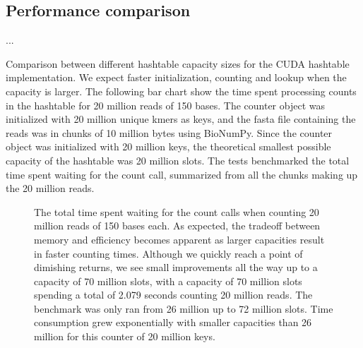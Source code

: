 
\subsection{Performance comparison}
...

Comparison between different hashtable capacity sizes for the CUDA hashtable implementation. We expect faster initialization, counting and lookup when the capacity is larger. 
The following bar chart show the time spent processing counts in the hashtable for 20 million reads of 150 bases.
The counter object was initialized with 20 million unique kmers as keys, and the fasta file containing the reads was in chunks of 10 million bytes using BioNumPy.
Since the counter object was initialized with 20 million keys, the theoretical smallest possible capacity of the hashtable was 20 million slots.
The tests benchmarked the total time spent waiting for the count call, summarized from all the chunks making up the 20 million reads.

\begin{figure}[ht!]\label{figure:cuht-capacity}
\begin{center}
\caption{The total time spent waiting for the count calls when counting 20 million reads of 150 bases each. As expected, the tradeoff between memory and efficiency becomes apparent as larger capacities result in faster counting times. Although we quickly reach a point of dimishing returns, we see small improvements all the way up to a capacity of 70 million slots, with a capacity of 70 million slots spending a total of 2.079 seconds counting 20 million reads. The benchmark was only ran from 26 million up to 72 million slots. Time consumption grew exponentially with smaller capacities than 26 million for this counter of 20 million keys.}
\end{center}
\end{figure}


